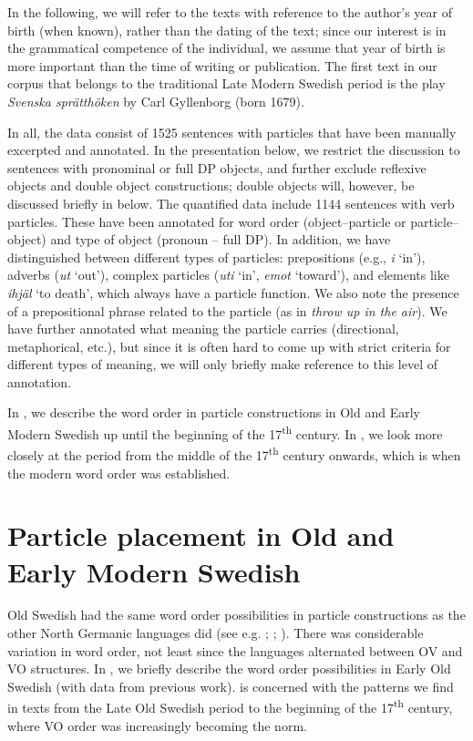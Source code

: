 \documentclass[output=paper]{langscibook}
\begin{document}
In the following, we will refer to the texts with reference to the author’s year of birth (when known), rather than the dating of the text; since our interest is in the grammatical competence of the individual, we assume that year of birth is more important than the time of writing or publication. The first text in our corpus that belongs to the traditional Late Modern Swedish period is the play \textit{Svenska sprätthöken} by Carl Gyllenborg (born 1679). 



In all, the data consist of 1525 sentences with particles that have been manually excerpted and annotated. In the presentation below, we restrict the discussion to sentences with pronominal or full DP objects, and further exclude reflexive objects and double object constructions; double objects will, however, be discussed briefly in  below. The quantified data include 1144 sentences with verb particles. These have been annotated for word order (object–particle or particle–object) and type of object (pronoun – full DP). In addition, we have distinguished between different types of particles: prepositions (e.g., \textit{i} ‘in’), adverbs (\textit{ut} ‘out’), complex particles (\textit{uti} ‘in’, \textit{emot} ‘toward’), and elements like \textit{ihjäl} ‘to death’, which always have a particle function. We also note the presence of a prepositional phrase related to the particle (as in \textit{throw up in the air}). We have further annotated what meaning the particle carries (directional, metaphorical, etc.), but since it is often hard to come up with strict criteria for different types of meaning, we will only briefly make reference to this level of annotation.



In , we describe the word order in particle constructions in Old and Early Modern Swedish up until the beginning of the 17\textsuperscript{th} century. In , we look more closely at the period from the middle of the 17\textsuperscript{th} century onwards, which is when the modern word order was established.


\section{Particle placement in Old and Early Modern Swedish}\label{sec:lalu:4}


Old Swedish had the same word order possibilities in particle constructions as the other North Germanic languages did (see e.g. \citealt{Ljunggren1932}; \citealt{Diderichsen1941}; \citealt{Hroarsdottir2008}). There was considerable variation in word order, not least since the languages alternated between OV and VO structures. In , we briefly describe the word order possibilities in Early Old Swedish (with data from previous work).  is concerned with the patterns we find in texts from the Late Old Swedish period to the beginning of the 17\textsuperscript{th} century, where VO order was increasingly becoming the norm.
\end{document}
